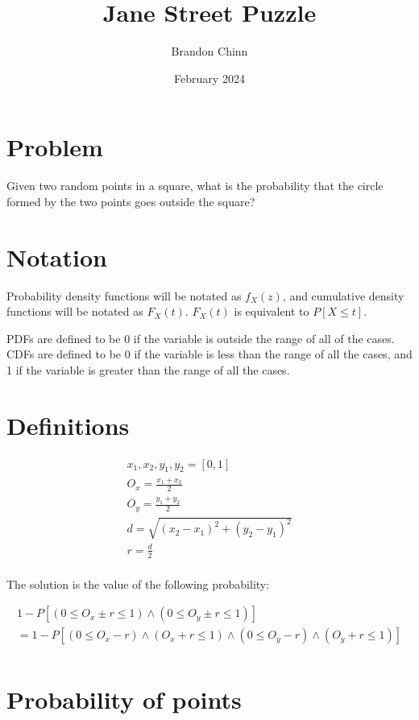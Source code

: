 \documentclass{article}
\title{Jane Street Puzzle}
\author{Brandon Chinn}
\date{February 2024}
\begin{document}
\maketitle

\section{Problem}

Given two random points in a square, what is the probability that the circle formed by the two points goes outside the square?

\section{Notation}

Probability density functions will be notated as $f_X(z)$, and cumulative density functions will be notated as $F_X(t)$. $F_X(t)$ is equivalent to $P[X \leq t]$.

PDFs are defined to be 0 if the variable is outside the range of all of the cases. CDFs are defined to be 0 if the variable is less than the range of all the cases, and 1 if the variable is greater than the range of all the cases.

\section{Definitions}

\begin{gather*}
    x_1, x_2, y_1, y_2 = [0, 1] \\
    O_x = \frac{x_1 + x_2}{2} \\
    O_y = \frac{y_1 + y_2}{2} \\
    d = \sqrt{(x_2 - x_1)^2 + (y_2 - y_1)^2} \\
    r = \frac{d}{2} \\
\end{gather*}

The solution is the value of the following probability:

\begin{align*}
  1 - P[(0 \leq O_x \pm r \leq 1) \land (0 \leq O_y \pm r \leq 1)] \\
= 1 - P[(0 \leq O_x - r) \land (O_x + r \leq 1) \land (0 \leq O_y - r) \land (O_y + r \leq 1)] \\
\end{align*}

\section{Probability of points}
\end{document}
